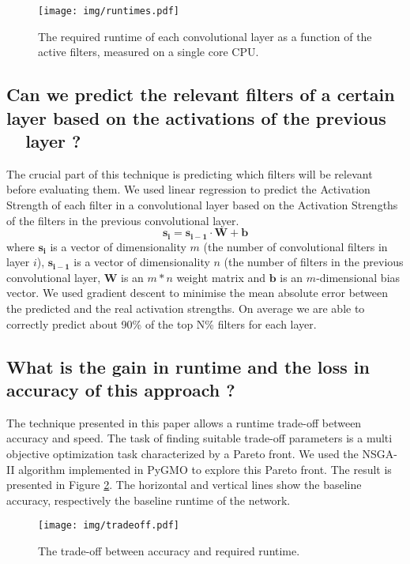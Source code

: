 \documentclass{article}
\begin{document}
\begin{figure}[t]
\begin{center}
\texttt{[image: img/runtimes.pdf]}
\caption{The required runtime of each convolutional layer as a function of the active filters, measured on a single core CPU.}
\label{fig:runtime}
\end{center}
\end{figure}
\subsection{Can we predict the relevant filters of a certain layer based on the activations of the previous \ \ layer ?}
The crucial part of this technique is predicting which filters will be relevant before evaluating them. We used linear regression to predict the Activation Strength of each filter in a convolutional layer based on the Activation Strengths of the filters in the previous convolutional layer.
\\\[\mathbf{s_i} = \mathbf{s_{i-1}} \cdot \mathbf{W} + \mathbf{b}\] where $\mathbf{s_i}$ is a vector of dimensionality $m$ (the number of convolutional filters in layer $i$), $\mathbf{s_{i-1}}$ is a vector of dimensionality $n$ (the number of filters in the previous convolutional layer, $\mathbf{W}$ is an $m*n$ weight matrix and $\mathbf{b}$ is an $m$-dimensional bias vector. We used gradient descent to minimise the mean absolute error between the predicted and the real activation strengths. On average we are able to correctly predict about 90\% of the top N\% filters for each layer.


\subsection{What is the gain in runtime and the loss in accuracy of this approach ?}
The technique presented in this paper allows a runtime trade-off between accuracy and speed. The task of finding suitable trade-off parameters is a multi objective optimization task characterized by a Pareto front. We used the NSGA-II algorithm \cite{deb2002fast} implemented in PyGMO \cite{izzo2012pygmo} to explore this Pareto front. The result is presented in Figure \ref{fig:tradeoff}. The horizontal and vertical lines show the baseline accuracy, respectively the baseline runtime of the network.

\begin{figure}[h]
\begin{center}
\texttt{[image: img/tradeoff.pdf]}
\caption{The trade-off between accuracy and required runtime.}
\label{fig:tradeoff}
\end{center}
\end{figure}
\end{document}
